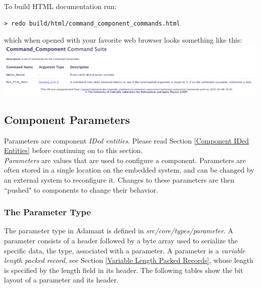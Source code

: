 To build HTML documentation run:

\vspace{5mm} %
\begin{verbatim}
> redo build/html/command_component_commands.html
\end{verbatim}
\vspace{5mm} %

which when opened with your favorite web browser looks something like this: \\

\vspace{5mm} %
\includegraphics[width=\textwidth]{images/commandshtml.png}
\vspace{5mm} %

\subsection{Component Parameters} \label{Component Parameters}

Parameters are component \textit{IDed entities}. Please read Section \ref{Component IDed Entities} before continuing on to this section. \\

\textit{Parameters} are values that are used to configure a component. Parameters are often stored in a single location on the embedded system, and can be changed by an external system to reconfigure it. Changes to these parameters are then ``pushed" to components to change their behavior.

\subsubsection{The Parameter Type}

The parameter type in Adamant is defined in \textit{src/core/types/parameter}. A parameter consists of a header followed by a byte array used to serialize the specific data, the type, associated with a parameter. A parameter is a \textit{variable length packed record}, see Section \ref{Variable Length Packed Records}, whose length is specified by the length field in its header. The following tables show the bit layout of a parameter and its header. \\

